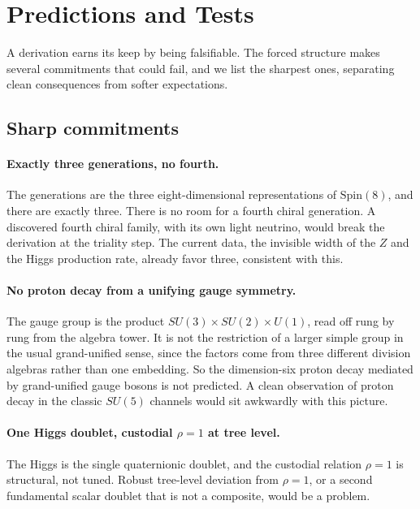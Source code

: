 \section{Predictions and Tests} \label{sec:predictions}

A derivation earns its keep by being falsifiable. The forced structure makes several commitments that could fail, and
we list the sharpest ones, separating clean consequences from softer expectations.

\subsection{Sharp commitments}

\paragraph{Exactly three generations, no fourth.} The generations are the three eight-dimensional representations of
$\mathrm{Spin}(8)$, and there are exactly three. There is no room for a fourth chiral generation. A discovered fourth
chiral family, with its own light neutrino, would break the derivation at the triality step. The current data, the
invisible width of the $Z$ and the Higgs production rate, already favor three, consistent with this.

\paragraph{No proton decay from a unifying gauge symmetry.} The gauge group is the product
$SU(3) \times SU(2) \times U(1)$, read off rung by rung from the algebra tower. It is not the restriction of a larger
simple group in the usual grand-unified sense, since the factors come from three different division algebras rather
than one embedding. So the dimension-six proton decay mediated by grand-unified gauge bosons is not predicted. A clean
observation of proton decay in the classic $SU(5)$ channels would sit awkwardly with this picture.

\paragraph{One Higgs doublet, custodial $\rho = 1$ at tree level.} The Higgs is the single quaternionic doublet, and the
custodial relation $\rho = 1$ is structural, not tuned. Robust tree-level deviation from $\rho = 1$, or a second
fundamental scalar doublet that is not a composite, would be a problem.

